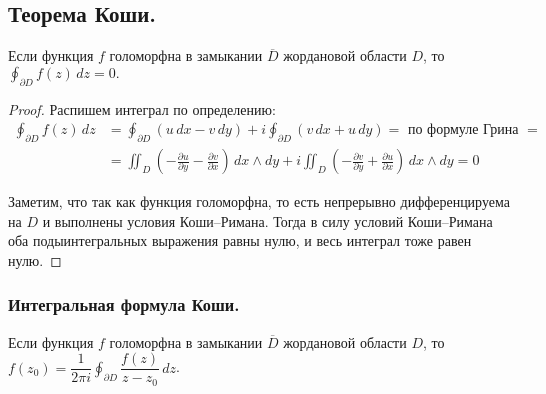 \subsection{Теорема Коши.}
\begin{theorem*}
	Если функция $f$ голоморфна в замыкании $\overline{D}$ жордановой области $D$, то $\oint_{\partial D} f(z)\,dz = 0.$
\end{theorem*}
\begin{proof}
	Распишем интеграл по определению:
	\begin{align*}
		\oint_{\partial D} f(z)\,dz &= 	\oint_{\partial D} (u\,dx - v\,dy) + i 	\oint_{\partial D} (v\,dx + u\, dy) = \text{ по формуле Грина } = \\		
		&= \iint_{D} \left(-\frac{\partial u}{\partial y} - \frac{\partial v}{\partial x}\right)\, dx \wedge dy + i \iint_{D} \left(-\frac{\partial v}{\partial y} + \frac{\partial u}{\partial x}\right)\, dx \wedge dy  = 0
	\end{align*}

	Заметим, что так как функция голоморфна, то есть непрерывно дифференцируема на $D$ и выполнены условия Коши--Римана. Тогда в силу условий Коши--Римана оба подыинтегральных выражения равны нулю, и весь интеграл тоже равен нулю.
\end{proof}	

\subsubsection{Интегральная формула Коши.}
	Если функция $f$ голоморфна в замыкании $\overline{D}$ жордановой области $D$, то $f(z_0) = \dfrac{1}{2\pi i} \oint_{\partial D} \dfrac{f(z)}{z - z_0}\, dz$.